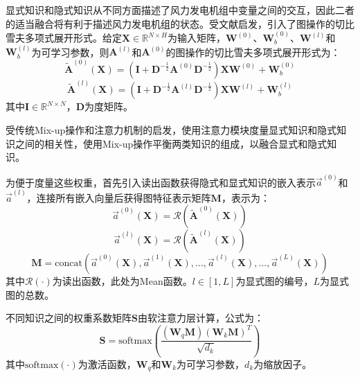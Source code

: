 显式知识和隐式知识从不同方面描述了风力发电机组中变量之间的交互，因此二者的适当融合将有利于描述风力发电机组的状态。受文献启发，引入了图操作的切比雪夫多项式展开形式。给定$\boldsymbol{X} \in \mathbb{R}^{N \times H}$为输入矩阵，$\boldsymbol{W}^{(0)}$、$\boldsymbol{W}_b^{(0)}$、$\boldsymbol{W}^{(l)}$和$\boldsymbol{W}_b^{(l)}$为可学习参数，则$\boldsymbol{A}^{(l)}$和$\boldsymbol{A}^{(0)}$的图操作的切比雪夫多项式展开形式为：
\begin{equation}
\tilde{\boldsymbol{A}}^{(0)}(\boldsymbol{X}) = \left(\boldsymbol{I} + \boldsymbol{D}^{-\frac{1}{2}}\boldsymbol{A}^{(0)}\boldsymbol{D}^{-\frac{1}{2}}\right)\boldsymbol{X}\boldsymbol{W}^{(0)} + \boldsymbol{W}_b^{(0)}
\end{equation}
\begin{equation}
\tilde{\boldsymbol{A}}^{(l)}(\boldsymbol{X}) = \left(\boldsymbol{I} + \boldsymbol{D}^{-\frac{1}{2}}\boldsymbol{A}^{(l)}\boldsymbol{D}^{-\frac{1}{2}}\right)\boldsymbol{X}\boldsymbol{W}^{(l)} + \boldsymbol{W}_b^{(l)}
\end{equation}
其中$\boldsymbol{I} \in \mathbb{R}^{N \times N}$，$\boldsymbol{D}$为度矩阵。

受传统Mix-up操作和注意力机制的启发，使用注意力模块度量显式知识和隐式知识之间的相关性，使用Mix-up操作平衡两类知识的组成，以融合显式和隐式知识。

为便于度量这些权重，首先引入读出函数获得隐式和显式知识的嵌入表示$\vec{a}^{(0)}$和$\vec{a}^{(l)}$，连接所有嵌入向量后获得图特征表示矩阵$\boldsymbol{M}$，表示为：
\begin{equation}
\vec{a}^{(0)}(\boldsymbol{X}) = \mathcal{R}\left(\tilde{\boldsymbol{A}}^{(0)}(\boldsymbol{X})\right)
\end{equation}
\begin{equation}
\vec{a}^{(l)}(\boldsymbol{X}) = \mathcal{R}\left(\tilde{\boldsymbol{A}}^{(l)}(\boldsymbol{X})\right)
\end{equation}
\begin{equation}
\boldsymbol{M} = \mathrm{concat}\left(\vec{a}^{(0)}(\boldsymbol{X}), \vec{a}^{(1)}(\boldsymbol{X}), \ldots, \vec{a}^{(l)}(\boldsymbol{X}), \ldots, \vec{a}^{(L)}(\boldsymbol{X})\right)
\end{equation}
其中$\mathcal{R}(\cdot)$为读出函数，此处为Mean函数。$l \in [1, L]$为显式图的编号，$L$为显式图的总数。

不同知识之间的权重系数矩阵$\boldsymbol{S}$由软注意力层计算，公式为：
\begin{equation}
\boldsymbol{S} = \mathrm{softmax}\left(\frac{(\boldsymbol{W}_q\boldsymbol{M})(\boldsymbol{W}_k\boldsymbol{M})^T}{\sqrt{d_k}}\right)
\end{equation}
其中$\mathrm{softmax}(\cdot)$为激活函数，$\boldsymbol{W}_q$和$\boldsymbol{W}_k$为可学习参数，$d_k$为缩放因子。

